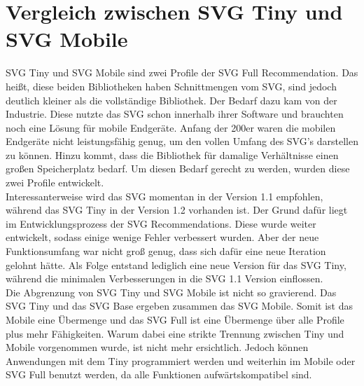 \section{Vergleich zwischen SVG Tiny und SVG Mobile}
SVG Tiny und SVG Mobile sind zwei Profile der SVG Full Recommendation. Das heißt, diese beiden Bibliotheken haben Schnittmengen vom SVG, sind jedoch deutlich kleiner als die vollständige Bibliothek. Der Bedarf dazu kam von der Industrie. Diese nutzte das SVG schon innerhalb ihrer Software und brauchten noch eine Lösung für mobile Endgeräte. Anfang der 200er waren die mobilen Endgeräte nicht leistungsfähig genug, um den vollen Umfang des SVG's darstellen zu können. Hinzu kommt, dass die Bibliothek für damalige Verhältnisse einen großen Speicherplatz bedarf. Um diesen Bedarf gerecht zu werden, wurden diese zwei Profile entwickelt.\\

Interessanterweise wird das SVG momentan in der Version 1.1 empfohlen, während das SVG Tiny in der Version 1.2 vorhanden ist. Der Grund dafür liegt im Entwicklungsprozess der SVG Recommendations. Diese wurde weiter entwickelt, sodass einige wenige Fehler verbessert wurden. Aber der neue Funktionsumfang war nicht groß genug, dass sich dafür eine neue Iteration gelohnt hätte. Als Folge entstand lediglich eine neue Version für das SVG Tiny, während die minimalen Verbesserungen in die SVG 1.1 Version einflossen.\\

Die Abgrenzung von SVG Tiny und SVG Mobile ist nicht so gravierend. Das SVG Tiny und das SVG Base ergeben zusammen das SVG Mobile. Somit ist das Mobile eine Übermenge und das SVG Full ist eine Übermenge über alle Profile plus mehr Fähigkeiten. Warum dabei eine strikte Trennung zwischen Tiny und Mobile vorgenommen wurde, ist nicht mehr ersichtlich. Jedoch können Anwendungen mit dem Tiny programmiert werden und weiterhin im Mobile oder SVG Full benutzt werden, da alle Funktionen aufwärtskompatibel sind.\\

